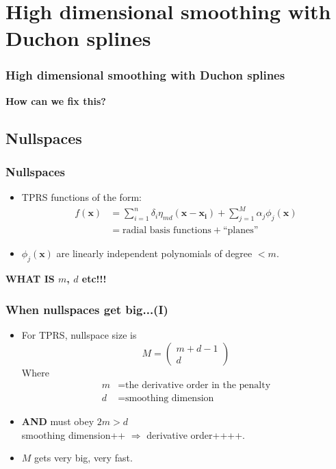 \documentclass[ignorenonframetext]{beamer} %
\newcommand{\bc}{\begin{center}}
\newcommand{\ec}{\end{center}}
\newcommand{\bi}{\begin{itemize}}
\newcommand{\ei}{\end{itemize}}
\begin{document}
\section{High dimensional smoothing with Duchon splines}

\begin{frame}
	\frametitle{High dimensional smoothing with Duchon splines}
	\bc \textbf{How can we fix this?}\ec
\end{frame}



\subsection{Nullspaces}

\begin{frame}
	\frametitle{Nullspaces}
	\bi
		\item TPRS functions of the form:
		\begin{align*}
		f(\mathbf{x}) &= \sum_{i=1}^n \delta_i \eta_{md}(\mathbf{x}-\mathbf{x_i}) + \sum_{j=1}^M \alpha_j \phi_j(\mathbf{x})\\
		&= \text{radial basis functions} + \text{``planes''}
		\end{align*}
		\item $\phi_j(\mathbf{x})$ are linearly independent polynomials of degree $< m$.
	\ei
	\textbf{WHAT IS $m$, $d$ etc!!!}
\end{frame}


\begin{frame}
	\frametitle{When nullspaces get big...(I)}
	\bi
		\item For TPRS, nullspace size is 
		\begin{equation*}
			M=\begin{pmatrix} m+d-1 \\ d  \end{pmatrix}
		\end{equation*}
		Where \begin{align*}
				m &= \text{the derivative order in the penalty}\\
				d &= \text{smoothing dimension}
			\end{align*}
		\item \textbf{AND} must obey $2m>d$ \\smoothing dimension++ $\Rightarrow$ derivative order++++.
		\item $M$ gets very big, very fast.
	\ei
\end{frame}
\end{document}
